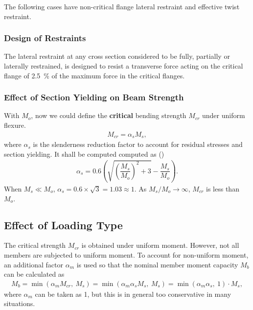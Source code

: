 The following cases have non-critical flange lateral restraint and effective twist restraint.
\begin{figure}[H]
\centering
\end{figure}
\subsubsection{Design of Restraints}
The lateral restraint at any cross section considered to be fully, partially or laterally restrained, is designed to resist a transverse force acting on the critical flange of \SI{2.5}{\percent} of the maximum force in the critical flanges.
\begin{figure}[H]
\centering
\end{figure}
\subsubsection{Effect of Section Yielding on Beam Strength}
With $M_o$, now we could define the \textbf{critical} bending strength $M_{cr}$ under uniform flexure.
\begin{gather}
M_{cr}=\alpha_sM_s,
\end{gather}
where $\alpha_s$ is the slenderness reduction factor to account for residual stresses and section yielding. It shall be computed computed as ()
\begin{gather}
\alpha_s=0.6\left(\sqrt{\left(\dfrac{M_s}{M_o}\right)^2+3}-\dfrac{M_s}{M_o}\right).
\end{gather}
When $M_s\ll{}M_o$, $\alpha_s=0.6\times\sqrt{3}=1.03\approx1$. As $M_s/M_o\rightarrow\infty$, $M_{cr}$ is less than $M_o$.
\begin{figure}[H]
\centering
\end{figure}
\subsection{Effect of Loading Type}
The critical strength $M_{cr}$ is obtained under uniform moment. However, not all members are subjected to uniform moment. To account for non-uniform moment, an additional factor $\alpha_m$ is used so that the nominal member moment capacity $M_b$ can be calculated as
\begin{gather}
M_{b}=\min\left(\alpha_mM_{cr},~M_s\right)=\min\left(\alpha_m\alpha_sM_s,~M_s\right)=\min\left(\alpha_m\alpha_s,~1\right)\cdot{}M_s,
\end{gather}
where $\alpha_m$ can be taken as \num{1}, but this is in general too conservative in many situations.

